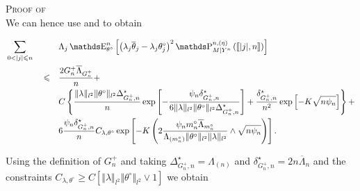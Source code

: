 \begin{pro}{\textsc{Proof of } \\}
We can hence use  and  to obtain

\begin{alignat*}{3}
& \sum\limits_{0 < \vert j \vert \leq n} && && \Lambda_{j} \E_{\theta^{\circ}}^{n}\left[\left(\lambda_{j} \overline{\theta}_{j} - \lambda_{j} \theta^{\circ}_{j}\right)^{2} \P_{M \vert Y^{n}}^{n, (\eta)}\left(\llbracket \vert j \vert, n \rrbracket\right)\right]\notag \\
& && \leq && \frac{2 G^{+}_{n} \overline{\Lambda}_{G^{+}_{n}}}{n} +\notag\\
& && && C \left\{\frac{\Vert \lambda \Vert_{l^{2}} \Vert \theta^{\circ} \Vert_{l^{2}} \Delta^{\star}_{G^{+}_{n}, n}}{n} \exp\left[ -\frac{\psi_{n} \delta^{\star}_{G^{+}_{n}, n}}{6 \Vert \lambda \Vert_{l^{2}} \Vert \theta^{\circ} \Vert_{l^{2}} \Delta^{\star}_{G^{+}_{n}, n}} \right] + \frac{\delta^{\star}_{G^{+}_{n}, n}}{n^{2}} \exp\left[- K \sqrt{n \psi_{n}}\right]\right\} +\notag \\
& && && 6 \frac{\psi_{n} \delta^{\star}_{G^{+}_{n}, n}}{n}C_{\lambda, \theta^{\circ}} \exp\left[- K \left(2 \frac{\psi_{n} m^{\circ}_{n} \overline{\Lambda}_{m^{\circ}_{n}}}{\Lambda_{(m^{\circ}_{n})}\Vert \theta^{\circ} \Vert_{l^{2}} \Vert \lambda \Vert_{l^{2}}} \wedge \sqrt{n \psi_{n}}\right)\right].
\end{alignat*}

Using the definition of $G^{+}_{n}$ and taking $\Delta^{\star}_{G^{+}_{n}, n} = \Lambda_{(n)}$ and $\delta^{\star}_{G^{+}_{n}, n} = 2 n \overline{\Lambda}_{n}$ and the constraints $C_{\lambda, \theta^{\circ}} \geq C \left[\Vert \lambda \Vert_{l^{2}} \Vert \theta^{\circ} \Vert_{l^{2}} \vee 1\right]$ we obtain


\end{pro}
